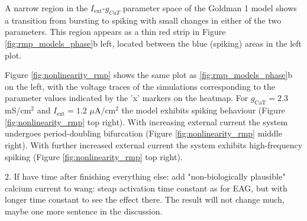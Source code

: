 \documentclass[../main.tex]{subfiles}
\begin{document}
\vspace*{3mm}

A narrow region in the $I_{\text{ext}}$-$g_{CaT}$ parameter space of the Goldman 1 model shows a transition from bursting to spiking with small changes in either of the two parameters.
This region appears as a thin red strip in Figure \ref{fig:rmp_models_phase}b left, located between the blue (spiking) areas in the left plot.

Figure \ref{fig:nonlinearity_rmp} shows the same plot as \ref{fig:rmp_models_phase}b on the left, with the voltage traces of the simulations corresponding to the parameter values indicated by the 'x' markers on the heatmap. For $g_{\text{CaT}}=2.3$ mS/cm$^2$ and $I_{\text{ext}}=1.2$ $\mu$A/cm$^2$ the model exhibits spiking behaviour (Figure \ref{fig:nonlinearity_rmp} top right). With increasing external current the system undergoes period-doubling bifurcation (Figure \ref{fig:nonlinearity_rmp} middle right). With further increased external current the system exhibits high-frequency spiking (Figure \ref{fig:nonlinearity_rmp} top right).

\color{red}



2. If have time after finishing everything else: add "non-biologically plausible" calcium current to wang: steap activation time constant as for EAG, but with longer time constant to see the effect there. The result will not change much, maybe one more sentence in the discussion.

\color{black}
\end{document}
